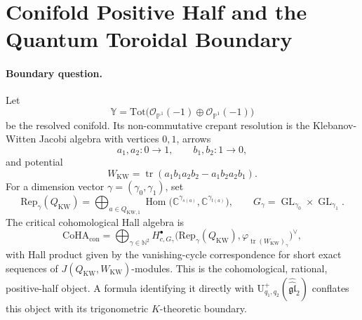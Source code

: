\providecommand{\CoHA}{\mathrm{CoHA}}
\providecommand{\KHA}{\mathrm{KHA}}
\providecommand{\U}{\mathrm{U}}
\providecommand{\Sh}{\mathrm{Sh}}
\providecommand{\C}{\mathbb{C}}
\providecommand{\P}{\mathbb{P}}
\providecommand{\N}{\mathbb{N}}
\providecommand{\bY}{\mathbb{Y}}
\providecommand{\cO}{\mathcal{O}}
\providecommand{\cZ}{\mathcal{Z}}
\providecommand{\Rep}{\mathrm{Rep}}
\providecommand{\Tot}{\mathrm{Tot}}
\providecommand{\tr}{\operatorname{tr}}
\providecommand{\fgl}{\mathfrak{gl}}
\providecommand{\fsl}{\mathfrak{sl}}
\providecommand{\Eone}{E_1}
\providecommand{\Etwo}{E_2}
\providecommand{\kch}{\kappa_{\mathrm{ch}}}
\providecommand{\kcat}{\kappa_{\mathrm{cat}}}
\providecommand{\kBKM}{\kappa_{\mathrm{BKM}}}
\providecommand{\kfib}{\kappa_{\mathrm{fiber}}}

\section*{Conifold Positive Half and the Quantum Toroidal Boundary}
\label{sec:conifold-quantum-toroidal-boundary}

\paragraph{Boundary question.}
Let
\[
  \bY =
  \Tot\bigl(\cO_{\P^1}(-1)\oplus\cO_{\P^1}(-1)\bigr)
\]
be the resolved conifold.  Its non-commutative crepant resolution is the
Klebanov-Witten Jacobi algebra with vertices \(0,1\), arrows
\[
  a_1,a_2:0\to 1,\qquad b_1,b_2:1\to 0,
\]
and potential
\[
  W_{\mathrm{KW}}
  =
  \tr(a_1b_1a_2b_2-a_1b_2a_2b_1).
\]
For a dimension vector \(\gamma=(\gamma_0,\gamma_1)\), set
\[
  \Rep_\gamma(Q_{\mathrm{KW}})
  =
  \bigoplus_{a\in Q_{\mathrm{KW},1}}
  \operatorname{Hom}
  \bigl(\C^{\gamma_{s(a)}},\C^{\gamma_{t(a)}}\bigr),
  \qquad
  G_\gamma=\operatorname{GL}_{\gamma_0}\times
  \operatorname{GL}_{\gamma_1}.
\]
The critical cohomological Hall algebra is
\[
  \CoHA_{\mathrm{con}}
  =
  \bigoplus_{\gamma\in\N^2}
  H^{\bullet}_{c,G_\gamma}
  \bigl(\Rep_\gamma(Q_{\mathrm{KW}}),
  \varphi_{\tr(W_{\mathrm{KW}})_\gamma}\bigr)^\vee ,
\]
with Hall product given by the vanishing-cycle correspondence for short
exact sequences of \(J(Q_{\mathrm{KW}},W_{\mathrm{KW}})\)-modules.
This is the cohomological, rational, positive-half object.  A formula
identifying it directly with
\(\U^+_{q_1,q_2}(\widehat{\widehat{\fgl}}_2)\) conflates this object with
its trigonometric \(K\)-theoretic boundary.

